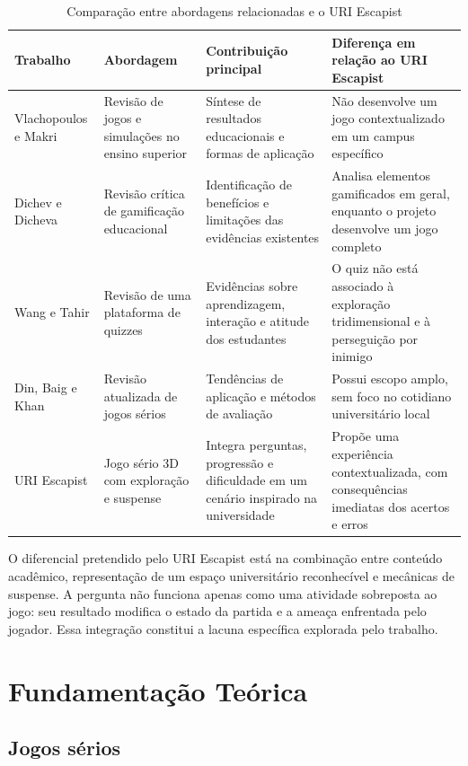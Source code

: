 \documentclass[12pt]{article}
\begin{document}
\begin{table}[H]
\centering
\caption{Comparação entre abordagens relacionadas e o URI Escapist}
\label{tab:comparacao}
\small
\begin{tabularx}{\textwidth}{p{2.7cm}X X X}
\toprule
\textbf{Trabalho} & \textbf{Abordagem} & \textbf{Contribuição principal} & \textbf{Diferença em relação ao URI Escapist} \\
\midrule
Vlachopoulos e Makri & Revisão de jogos e simulações no ensino superior & Síntese de resultados educacionais e formas de aplicação & Não desenvolve um jogo contextualizado em um campus específico \\
\addlinespace
Dichev e Dicheva & Revisão crítica de gamificação educacional & Identificação de benefícios e limitações das evidências existentes & Analisa elementos gamificados em geral, enquanto o projeto desenvolve um jogo completo \\
\addlinespace
Wang e Tahir & Revisão de uma plataforma de quizzes & Evidências sobre aprendizagem, interação e atitude dos estudantes & O quiz não está associado à exploração tridimensional e à perseguição por inimigo \\
\addlinespace
Din, Baig e Khan & Revisão atualizada de jogos sérios & Tendências de aplicação e métodos de avaliação & Possui escopo amplo, sem foco no cotidiano universitário local \\
\addlinespace
URI Escapist & Jogo sério 3D com exploração e suspense & Integra perguntas, progressão e dificuldade em um cenário inspirado na universidade & Propõe uma experiência contextualizada, com consequências imediatas dos acertos e erros \\
\bottomrule
\end{tabularx}
\end{table}

O diferencial pretendido pelo URI Escapist está na combinação entre conteúdo acadêmico, representação de um espaço universitário reconhecível e mecânicas de suspense. A pergunta não funciona apenas como uma atividade sobreposta ao jogo: seu resultado modifica o estado da partida e a ameaça enfrentada pelo jogador. Essa integração constitui a lacuna específica explorada pelo trabalho.

\section{Fundamentação Teórica}

\subsection{Jogos sérios}
\end{document}
